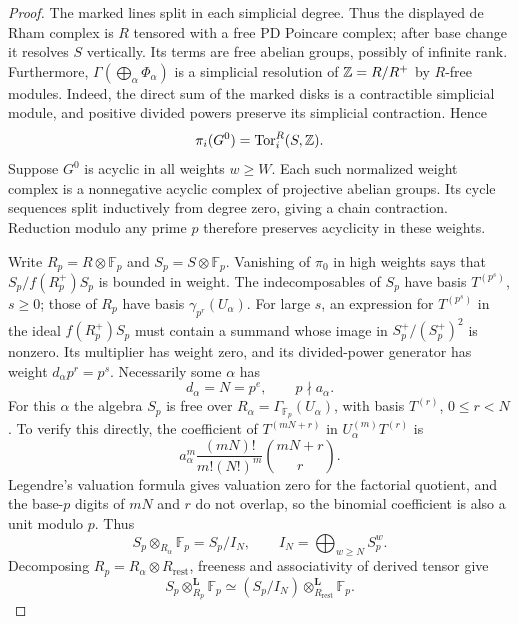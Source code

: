 \begin{proof}
The marked lines split in each simplicial degree. Thus the displayed
de Rham complex is $R$ tensored with a free PD Poincare complex;
after base change it resolves $S$ vertically. Its terms are free
abelian groups, possibly of infinite rank. Furthermore,
$\Gamma(\bigoplus_\alpha\Phi_\alpha)$ is a simplicial resolution
of $\mathbb Z=R/R^+$ by $R$-free modules. Indeed, the direct sum of the
marked disks is a contractible simplicial module, and positive
divided powers preserve its simplicial contraction. Hence
\[
 \pi_i(G^0)=\operatorname{Tor}_i^R(S,\mathbb Z).
\]
Suppose $G^0$ is acyclic in all weights $w\ge W$.
Each such normalized weight complex is a nonnegative acyclic
complex of projective abelian groups. Its cycle sequences split
inductively from degree zero, giving a chain contraction.
Reduction modulo any prime $p$ therefore preserves acyclicity in
these weights.

Write $R_p=R\otimes\mathbb F_p$ and $S_p=S\otimes\mathbb F_p$.
Vanishing of $\pi_0$ in high weights says that
$S_p/f(R_p^+)S_p$ is bounded in weight. The indecomposables of
$S_p$ have basis $T^{(p^s)}$, $s\ge0$; those of $R_p$ have basis
$\gamma_{p^r}(U_\alpha)$. For large $s$, an expression for
$T^{(p^s)}$ in the ideal $f(R_p^+)S_p$ must contain a summand whose
image in $S_p^+/(S_p^+)^2$ is nonzero. Its multiplier has weight
zero, and its divided-power generator has weight
$d_\alpha p^r=p^s$. Necessarily some $\alpha$ has
\[
 d_\alpha=N=p^e,\qquad p\nmid a_\alpha.
\]
For this $\alpha$ the algebra $S_p$ is free over
$R_\alpha=\Gamma_{\mathbb F_p}(U_\alpha)$, with basis
$T^{(r)}$, $0\le r<N$. To verify this directly, the coefficient of
$T^{(mN+r)}$ in $U_\alpha^{(m)}T^{(r)}$ is
\[
 a_\alpha^m\frac{(mN)!}{m!(N!)^m}\binom{mN+r}{r}.
\]
Legendre's valuation formula gives valuation zero for the factorial
quotient, and the base-$p$ digits of $mN$ and $r$ do not overlap,
so the binomial coefficient is also a unit modulo $p$. Thus
\[
 S_p\otimes_{R_\alpha}\mathbb F_p=S_p/I_N,
 \qquad I_N=\bigoplus_{w\ge N}S_p^w.
\]
Decomposing $R_p=R_\alpha\otimes R_{\mathrm{rest}}$, freeness and
associativity of derived tensor give
\[
 S_p\otimes_{R_p}^{\mathbf L}\mathbb F_p
 \simeq (S_p/I_N)\otimes_{R_{\mathrm{rest}}}^{\mathbf L}\mathbb F_p.
\]


\end{proof}
